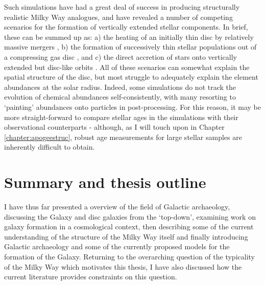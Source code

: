  Such simulations have had a great deal of success in producing structurally realistic Milky Way analogues, and have revealed a number of competing scenarios for the formation of vertically extended stellar components. In brief, these can be summed up as: a) the heating of an initially thin disc by relatively massive mergers \citep[e.g.][]{2004ApJ...612..894B,2008MNRAS.391.1806V,2009ApJ...700.1896K,2013A&A...558A...9M}, b) the formation of successively thin stellar populations out of a compressing gas disc \citep[e.g.][]{2013ApJ...773...43B,2017arXiv170901040N}, and c) the direct accretion of stars onto vertically extended but disc-like orbits \citep[e.g.][]{2003ApJ...597...21A}. All of these scenarios can somewhat explain the spatial structure of the disc, but most struggle to adequately explain the element abundances at the solar radius. Indeed, some simulations do not track the evolution of chemical abundances self-consistently, with many resorting to `painting' abundances onto particles in post-processing. For this reason, it may be more straight-forward to compare stellar ages in the simulations with their observational counterparts - although, as I will touch upon in Chapter \ref{chapter:apogeestruc}, robust age measurements for large stellar samples are inherently difficult to obtain.
 
\section{Summary and thesis outline}

I have thus far presented a overview of the field of Galactic archaeology, discussing the Galaxy and disc galaxies from the `top-down', examining work on galaxy formation in a cosmological context, then describing some of the current understanding of the structure of the Milky Way itself and finally introducing Galactic archaeology and some of the currently proposed models for the formation of the Galaxy. Returning to the overarching question of the typicality of the Milky Way which motivates this thesis, I have also discussed how the current literature provides constraints on this question. 

